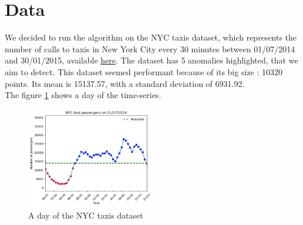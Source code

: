 \documentclass[11pt]{article}
\begin{document}
\section{Data}

We decided to run the algorithm on the NYC taxis dataset, which represents the number of calls to taxis in New York City every 30 minutes between 01/07/2014 and 30/01/2015, available \href{https://github.com/numenta/NAB/blob/master/data/realKnownCause/nyc_taxi.csv}{here}. 
The dataset has 5 anomalies highlighted, that we aim to detect. 
This dataset seemed performant because of its big size : 10320 points. 
Its mean is 15137.57, with a standard deviation of 6931.92. \\
The figure \ref{fig:taxis} shows a day of the time-series.
\begin{figure}[h]
    \centering
    \includegraphics[width=0.5\textwidth]{example_day.png}
    \caption{A day of the NYC taxis dataset}
    \label{fig:taxis}
\end{figure}
\end{document}
